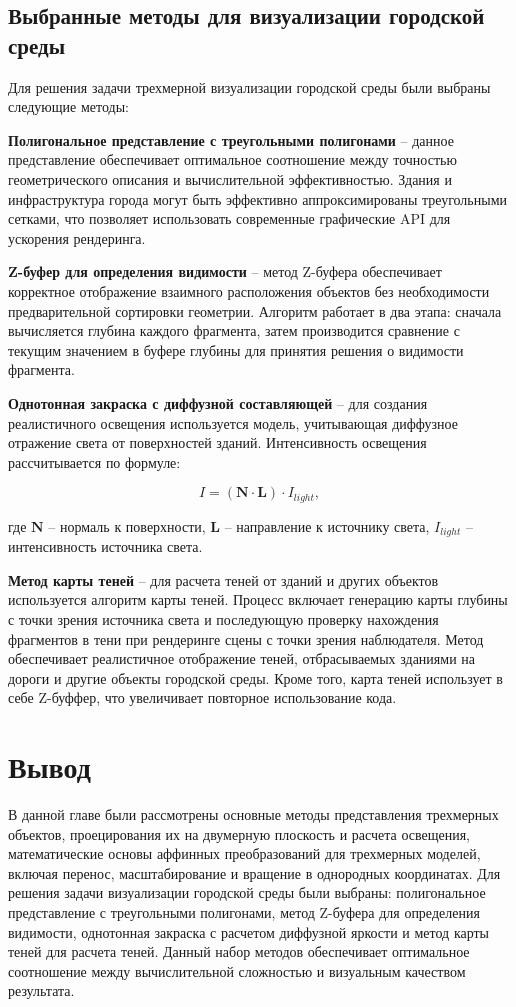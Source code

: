 \subsection{Выбранные методы для визуализации городской среды}
Для решения задачи трехмерной визуализации городской среды были выбраны следующие методы:

\textbf{Полигональное представление с треугольными полигонами} -- данное представление обеспечивает оптимальное соотношение между точностью геометрического описания и вычислительной эффективностью. Здания и инфраструктура города могут быть эффективно аппроксимированы треугольными сетками, что позволяет использовать современные графические API для ускорения рендеринга.

\textbf{Z-буфер для определения видимости} -- метод Z-буфера обеспечивает корректное отображение взаимного расположения объектов без необходимости предварительной сортировки геометрии. Алгоритм работает в два этапа: сначала вычисляется глубина каждого фрагмента, затем производится сравнение с текущим значением в буфере глубины для принятия решения о видимости фрагмента.

\textbf{Однотонная закраска с диффузной составляющей} -- для создания реалистичного освещения используется модель, учитывающая диффузное отражение света от поверхностей зданий. Интенсивность освещения рассчитывается по формуле:

\begin{equation}
I = (\mathbf{N} \cdot \mathbf{L}) \cdot I_{light},
\end{equation}

где $\mathbf{N}$ -- нормаль к поверхности, $\mathbf{L}$ -- направление к источнику света, $I_{light}$ -- интенсивность источника света.

\textbf{Метод карты теней} -- для расчета теней от зданий и других объектов используется алгоритм карты теней. Процесс включает генерацию карты глубины с точки зрения источника света и последующую проверку нахождения фрагментов в тени при рендеринге сцены с точки зрения наблюдателя. Метод обеспечивает реалистичное отображение теней, отбрасываемых зданиями на дороги и другие объекты городской среды. Кроме того, карта теней использует в себе Z-буффер, что увеличивает повторное использование кода.


\section*{Вывод}
В данной главе были рассмотрены основные методы представления трехмерных объектов, проецирования их на двумерную плоскость и расчета освещения, математические основы аффинных преобразований для трехмерных моделей, включая перенос, масштабирование и вращение в однородных координатах. Для решения задачи визуализации городской среды были выбраны: полигональное представление с треугольными полигонами, метод Z-буфера для определения видимости, однотонная закраска с расчетом диффузной яркости и метод карты теней для расчета теней. Данный набор методов обеспечивает оптимальное соотношение между вычислительной сложностью и визуальным качеством результата.